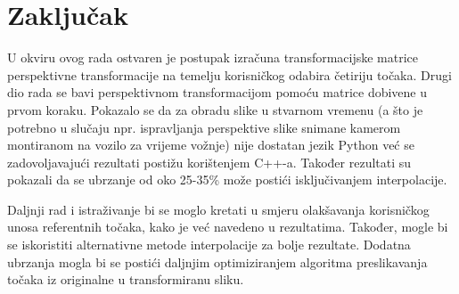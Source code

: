 \chapter{Zaključak}
\label{ch:zakljucak}

U okviru ovog rada ostvaren je postupak izračuna transformacijske matrice perspektivne transformacije na temelju korisničkog odabira četiriju točaka. Drugi dio rada se bavi perspektivnom transformacijom pomoću matrice dobivene u prvom koraku. Pokazalo se da za obradu slike u stvarnom vremenu (a što je potrebno u slučaju npr. ispravljanja perspektive slike snimane kamerom montiranom na vozilo za vrijeme vožnje) nije dostatan jezik Python već se zadovoljavajući rezultati postižu korištenjem C++-a. Također rezultati su pokazali da se ubrzanje od oko 25-35\% može postići isključivanjem interpolacije. 

Daljnji rad i istraživanje bi se moglo kretati u smjeru olakšavanja korisničkog unosa referentnih točaka, kako je već navedeno u rezultatima. Također, mogle bi se iskoristiti alternativne metode interpolacije za bolje rezultate. Dodatna ubrzanja mogla bi se postići daljnjim optimiziranjem algoritma preslikavanja točaka iz originalne u transformiranu sliku.
